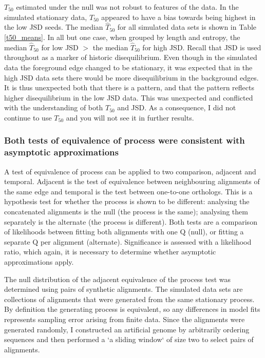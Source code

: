 

$T_{50}$ estimated under the null was not robust to features of the data. In the simulated stationary data, $T_{50}$ appeared to have a bias towards being highest in the low JSD seeds. The median $\hat T_{50}$ for all simulated data sets is shown in Table \ref{t50_means}. In all but one case, when grouped by length and entropy, the median $\hat T_{50}$ for low JSD $>$ the median $\hat T_{50}$ for high JSD. Recall that JSD is used throughout as a marker of historic disequilibrium. Even though in the simulated data the foreground edge changed to be stationary, it was expected that in the high JSD data sets there would be more disequilibrium in the background edges. It is thus unexpected both that there is a pattern, and that the pattern reflects higher disequilibrium in the low JSD data. This was unexpected and conflicted with the understanding of both $T_{50}$ and JSD.  As a consequence, I did not continue to use $T_{50}$ and you will not see it in further results.



\subsubsection*{Both tests of equivalence of process were consistent with asymptotic approximations}

A test of equivalence of process can be applied to two comparison, adjacent and temporal. Adjacent is the test of equivalence between neighbouring alignments of the same edge and temporal is the test between one-to-one orthologs. This is a hypothesis test for whether the process is shown to be different: analysing the concatenated alignments is the null (the process is the same); analysing them separately is the alternate (the process is different). Both tests are a comparison of likelihoods between fitting both alignments with one $\mathrm{Q}$ (null), or fitting a separate $\mathrm{Q}$ per alignment (alternate). Significance is assessed with a likelihood ratio, which again, it is necessary to determine whether asymptotic approximations apply. 

The null distribution of the adjacent equivalence of the process test was determined using pairs of synthetic alignments. The simulated data sets are collections of alignments that were generated from the same stationary process. By definition the generating process is equivalent, so any differences in model fits represents sampling error arising from finite data. Since the alignments were generated randomly, I constructed an artificial genome by arbitrarily ordering sequences and then performed a `a sliding window` of size two to select pairs of alignments.

